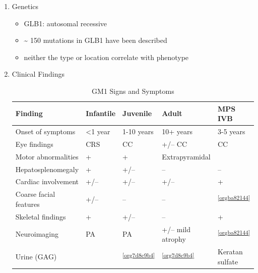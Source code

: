\documentclass{scrartcl}
\begin{document}
\begin{enumerate}
\begin{enumerate}
\item Lysosomal multi-enzyme complex
\label{sec:orga4231b5}

\begin{itemize}
\item \(\beta\)-galactosidase forms a heterotrimeric complex with:
\begin{itemize}
\item cathepsin A/PPCA : CTSA
\item neuraminidase: NEU1
\end{itemize}

\item \(\downarrow\) cathepsin A \(\to\) 2\degree  deficiency of NEU1
\begin{itemize}
\item ML-1 (sialidosis)
\end{itemize}
\end{itemize}
\end{enumerate}

\item Genetics
\label{sec:orgd104172}
\begin{itemize}
\item GLB1: autosomal recessive
\item \textasciitilde{} 150 mutations in GLB1 have been described
\item neither the type or location correlate with phenotype
\end{itemize}

\item Clinical Findings
\label{sec:org9ab8b59}

\begin{table}[htbp]
\caption[GM1 Signs and Symptoms]{\label{tab:orgbe15406}
GM1 Signs and Symptoms}
\centering
\begin{tabular}{lllll}
Finding & Infantile & Juvenile & Adult & MPS IVB\\
\hline
Onset of symptoms & <1 year & 1-10 years & 10+ years & 3-5 years\\
Eye findings & CRS & CC & +/– CC & CC\\
Motor abnormalities & + & + & Extrapyramidal & \footnotemark\\
Hepatosplenomegaly & + & +/– & – & –\\
Cardiac involvement & +/– & +/– & +/– & +\\
Coarse facial features & +/– & – & – & \textsuperscript{\ref{orgba82144}}\\
Skeletal findings & + & +/– & – & +\\
Neuroimaging & PA & PA & +/– mild atrophy & \textsuperscript{\ref{orgba82144}}\\
Urine (GAG) & \footnotemark & \textsuperscript{\ref{org7d8c9b4}} & \textsuperscript{\ref{org7d8c9b4}} & Keratan sulfate \footnotemark\\
\end{tabular}
\end{table}


\end{enumerate}
\end{document}
